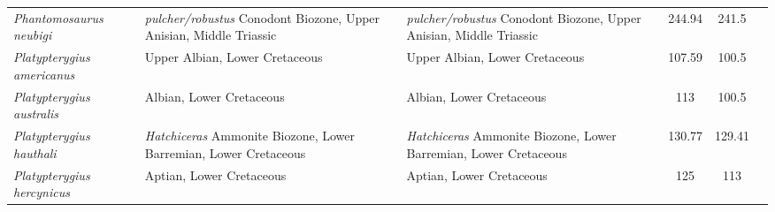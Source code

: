 \begin{longtabu}{>{\itshape}lXXSSl}
	Phantomosaurus neubigi                               &
        \emph{pulcher/robustus} Conodont Biozone, Upper Anisian, Middle Triassic
                                                             &
        \emph{pulcher/robustus} Conodont Biozone, Upper Anisian, Middle Triassic
                                                             & 244.94
                                                             & 241.5
                                                             &
                                                             \cite{Sander1997Amr} \\                     
	Platypterygius americanus                            & Upper Albian,
        Lower Cretaceous
                                                             & Upper Albian,
        Lower Cretaceous
                                                             & 107.59
                                                             & 100.5
                                                             &
                                                             \cite{Romer1968CGUSC} \\                      
	Platypterygius australis                             & Albian, Lower
        Cretaceous
                                                             & Albian, Lower
        Cretaceous
                                                             & 113
                                                             & 100.5
                                                             &
                                                             \cite{Wade1984L,Wade1990MQM} \\              
	Platypterygius hauthali                              &
        \emph{Hatchiceras} Ammonite Biozone, Lower Barremian, Lower Cretaceous
                                                             &
        \emph{Hatchiceras} Ammonite Biozone, Lower Barremian, Lower Cretaceous
                                                             & 130.77
                                                             & 129.41
                                                             &
                                                             \cite{Fernandez2005JVP} \\                  
	Platypterygius hercynicus                            & Aptian, Lower
        Cretaceous
                                                             & Aptian, Lower
        Cretaceous
                                                             & 125
                                                             & 113

\end{longtabu}
